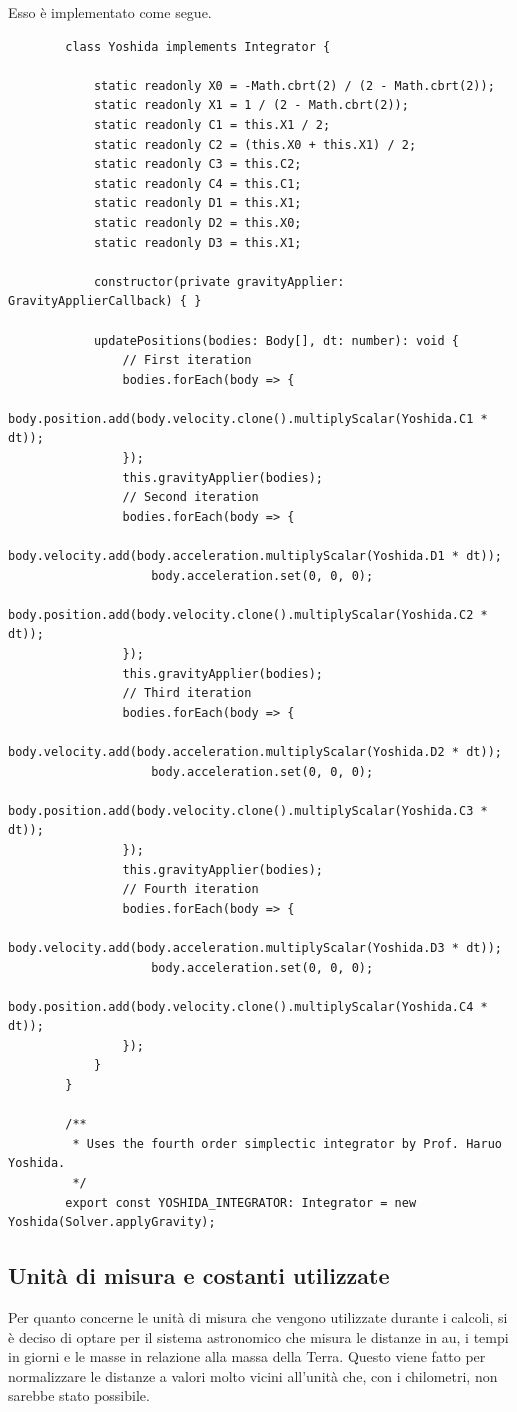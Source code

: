 \documentclass[11pt]{article}
\begin{document}
	Esso è implementato come segue.
	
	\begin{verbatim}
		class Yoshida implements Integrator {

			static readonly X0 = -Math.cbrt(2) / (2 - Math.cbrt(2));
			static readonly X1 = 1 / (2 - Math.cbrt(2));
			static readonly C1 = this.X1 / 2;
			static readonly C2 = (this.X0 + this.X1) / 2;
			static readonly C3 = this.C2;
			static readonly C4 = this.C1;
			static readonly D1 = this.X1;
			static readonly D2 = this.X0;
			static readonly D3 = this.X1;

			constructor(private gravityApplier: GravityApplierCallback) { }

			updatePositions(bodies: Body[], dt: number): void {
				// First iteration
				bodies.forEach(body => { 
					body.position.add(body.velocity.clone().multiplyScalar(Yoshida.C1 * dt));
				});
				this.gravityApplier(bodies);
				// Second iteration 
				bodies.forEach(body => {
					body.velocity.add(body.acceleration.multiplyScalar(Yoshida.D1 * dt));
					body.acceleration.set(0, 0, 0); 
					body.position.add(body.velocity.clone().multiplyScalar(Yoshida.C2 * dt));
				});
				this.gravityApplier(bodies);
				// Third iteration 
				bodies.forEach(body => {
					body.velocity.add(body.acceleration.multiplyScalar(Yoshida.D2 * dt));
					body.acceleration.set(0, 0, 0);
					body.position.add(body.velocity.clone().multiplyScalar(Yoshida.C3 * dt));
				});
				this.gravityApplier(bodies);
				// Fourth iteration 
				bodies.forEach(body => {
					body.velocity.add(body.acceleration.multiplyScalar(Yoshida.D3 * dt));
					body.acceleration.set(0, 0, 0);
					body.position.add(body.velocity.clone().multiplyScalar(Yoshida.C4 * dt));
				});
			}
		}

		/**
		 * Uses the fourth order simplectic integrator by Prof. Haruo Yoshida.
		 */
		export const YOSHIDA_INTEGRATOR: Integrator = new Yoshida(Solver.applyGravity);
	\end{verbatim}

	\subsection{Unità di misura e costanti utilizzate}

	Per quanto concerne le unità di misura che vengono utilizzate durante i calcoli, si è deciso di optare per il sistema astronomico che misura le distanze in \si{\astronomicalunit}, i tempi in giorni e le masse in relazione alla massa della Terra. Questo viene fatto per normalizzare le distanze a valori molto vicini all'unità che, con i chilometri, non sarebbe stato possibile.
\end{document}
